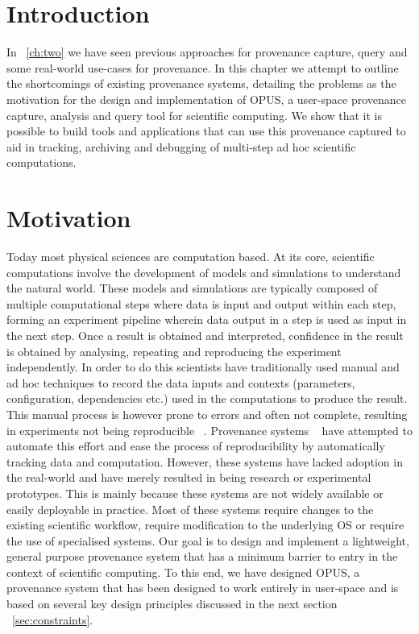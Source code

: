 \documentclass[withindex,glossary]{cam-thesis}
\begin{document}
\section{Introduction}
In ~\ref{ch:two} we have seen previous approaches for provenance capture, query and some real-world use-cases for provenance. In this chapter we attempt to outline the shortcomings of existing provenance systems, detailing the problems as the motivation for the design and implementation of OPUS, a user-space provenance capture, analysis and query tool for scientific computing. We show that it is possible to build tools and applications that can use this provenance captured to aid in tracking, archiving and debugging of multi-step ad hoc scientific computations.

\section{Motivation}
Today most physical sciences are computation based.
At its core, scientific computations involve the development of models and simulations to understand the natural world. 
These models and simulations are typically composed of multiple computational steps where data is input and output within each step, forming an experiment pipeline wherein data output in a step is used as input in the next step.
Once a result is obtained and interpreted, confidence in the result is obtained by analysing, repeating and reproducing the experiment independently.
In order to do this scientists have traditionally used manual and ad hoc techniques to record the data inputs and contexts (parameters, configuration, dependencies etc.) used in the computations to produce the result.
This manual process is however prone to errors and often not complete, resulting in experiments not being reproducible ~\cite{non-rep, nature}. 
Provenance systems ~\cite{PASS, BURRITO, StoyBook} have attempted to automate this effort and ease the process of reproducibility by automatically tracking data and computation.
However, these systems have lacked adoption in the real-world and have merely resulted in being research or experimental prototypes.
This is mainly because these systems are not widely available or easily deployable in practice.
Most of these systems require changes to the existing scientific workflow, require modification to the underlying OS or require the use of specialised systems.
Our goal is to design and implement a lightweight, general purpose provenance system that has a minimum barrier to entry in the context of scientific computing.
To this end, we have designed OPUS, a provenance system that has been designed to work entirely in user-space and is based on several key design principles discussed in the next section ~\ref{sec:constraints}.
\end{document}
